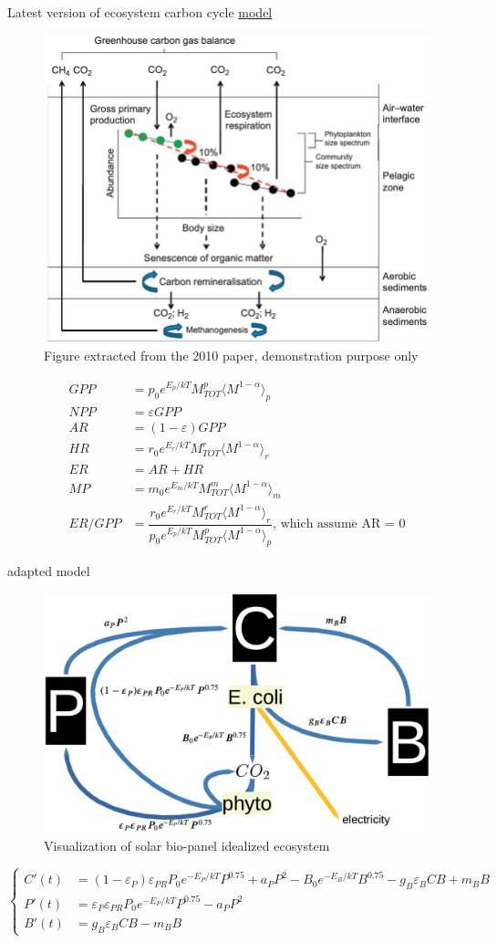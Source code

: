 \documentclass[a4paper,11pt]{article}
\begin{document}
Latest version of ecosystem carbon cycle \href{https://www.sciencedirect.com/science/article/pii/B9780123850058000071}{model}

\begin{figure}[H]
    \centering
    \includegraphics[width=.4\linewidth]{sandbox/graph/paper2010.png}
    \caption{Figure extracted from the 2010 paper, demonstration purpose only}
    \label{ppr10}
\end{figure}

\begin{align}
    GPP &= p_0e^{E_p/kT}M_{TOT}^p\langle M^{1-\alpha}\rangle_p\\
    NPP &= \varepsilon GPP\\
    AR &= (1-\varepsilon)GPP\\
    HR &= r_0e^{E_r/kT}M_{TOT}^r\langle M^{1-\alpha}\rangle_r\\
    ER &= AR + HR\\
    MP &= m_0e^{E_m/kT}M_{TOT}^m\langle M^{1-\alpha}\rangle_m\\
    ER/GPP &= \dfrac{r_0e^{E_r/kT}M_{TOT}^r\langle M^{1-\alpha}\rangle_r}{p_0e^{E_p/kT}M_{TOT}^p\langle M^{1-\alpha}\rangle_p}\text{, which assume AR = 0}
\end{align}

adapted model

\begin{figure}[H]
    \centering
    \includegraphics[width=.4\linewidth]{sandbox/graph/ebc7.png}
    \caption{Visualization of solar bio-panel idealized ecosystem}
    \label{ebc7}
\end{figure}

\begin{equation}\left\{\begin{array}{rl}
C'(t) &= (1-\varepsilon_P)\varepsilon_{PR}P_0e^{-E_P/kT}P^{0.75} +a_PP^2 -B_0e^{-E_B/kT}B^{0.75} -g_B\varepsilon_{B}CB +m_BB\\
P'(t) &= \varepsilon_P\varepsilon_{PR}P_0e^{-E_P/kT}P^{0.75} -a_PP^2\\
B'(t) &= g_B\varepsilon_{B}CB -m_BB
\end{array}\right.\end{equation}
\end{document}
